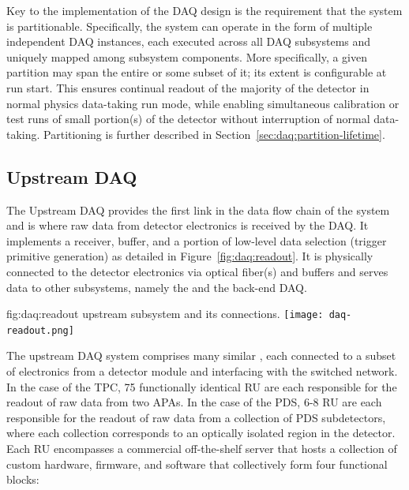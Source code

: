 Key to the implementation of the DAQ design is the requirement that
the system is partitionable. Specifically, the system can operate in
the form of multiple independent DAQ instances, each 
executed across all DAQ subsystems and uniquely mapped among subsystem components. 
More specifically, a given partition may span the entire %
 or some subset of it; its extent is configurable at
run start. This ensures continual readout of the
majority of the detector in normal physics data-taking run mode, while
enabling simultaneous calibration or test runs of small portion(s) of the
detector without interruption of normal data-taking. 
Partitioning is further described in Section~\ref{sec:daq:partition-lifetime}.

\subsection{Upstream DAQ}
\label{sec:daq:design-upstream}

The Upstream DAQ provides the first link in the data flow chain of
the  system and is where raw data from detector electronics
is received by the DAQ.
It implements a receiver, buffer, and a portion of low-level data
selection (trigger primitive generation) as detailed in Figure~\ref{fig:daq:readout}.
It is physically connected to the detector electronics via optical
fiber(s) and buffers and serves data to other  subsystems,
namely the  and the back-end DAQ.

\begin{dunefigure}{fig:daq:readout}{ upstream  subsystem and its connections.}
  \texttt{[image: daq-readout.png]}
\end{dunefigure}


The upstream DAQ system comprises many similar , each
connected to a subset of electronics from a detector module and
interfacing with the  switched network. In the case of the
TPC, 75 functionally identical RU are each responsible for the readout of raw data from two
APAs. In the case of the PDS, 6-8 RU are each responsible for the
readout of raw data from a collection of PDS subdetectors, where each
collection corresponds to an optically isolated region in the
detector. 
Each RU encompasses a commercial off-the-shelf server that hosts a
collection of custom hardware, 
firmware, and software that collectively form four functional blocks:

